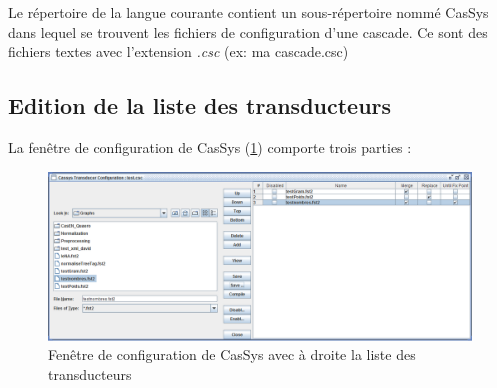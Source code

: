 Le répertoire de la langue courante contient un sous-répertoire nommé CasSys dans lequel se trouvent
les fichiers de configuration d'une cascade. Ce sont des fichiers textes avec l'extension \textit{.csc} (ex: ma cascade.csc)

\subsection{Edition de la liste des transducteurs}
\label{subsec:editlistTrans}

La fenêtre de configuration de CasSys (\ref{fig13-03}) comporte trois parties :

\begin{figure}[!htb]
  \centering
  \includegraphics[width=16cm]{resources/img/fig13-03.png}
  \caption{Fenêtre de configuration de CasSys avec à droite la liste des transducteurs}
  \label{fig13-03}
\end{figure}

